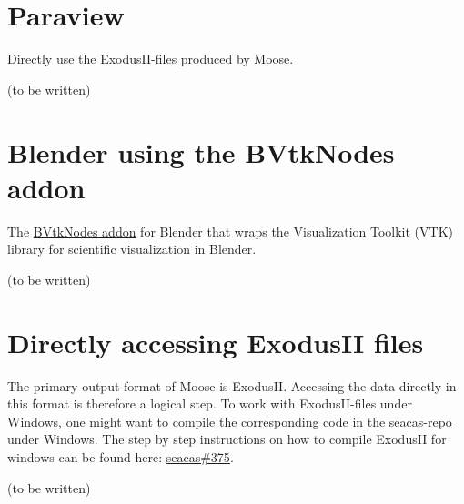 \section{Paraview}
\label{chap:postprocessing-paraview}

Directly use the ExodusII-files produced by Moose.

(to be written)

\section{Blender using the BVtkNodes addon}
\label{chap:postprocessing-blender}

The \href{https://github.com/tkeskita/BVtkNodes}{BVtkNodes addon} for Blender
that wraps the Visualization Toolkit (VTK) library for scientific visualization
in Blender.

(to be written)

\section{Directly accessing ExodusII files}
\label{chap:postprocessing-ExodusII}

The primary output format of Moose is ExodusII. Accessing the data directly in
this format is therefore a logical step. To work with ExodusII-files under
Windows, one might want to compile the corresponding code in the
\href{https://github.com/sandialabs/seacas}{seacas-repo} under Windows. The
step by step instructions on how to compile ExodusII for windows can be found
here: \href{https://github.com/sandialabs/seacas/discussions/375}{seacas\#375}.

(to be written)
